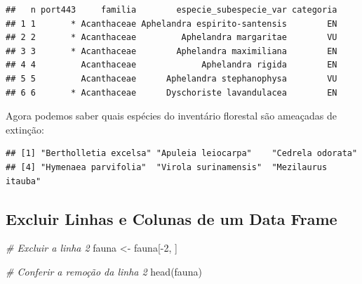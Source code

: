 \documentclass[
]{article}
\newenvironment{Shaded}{\begin{snugshade}}{\end{snugshade}}
\newcommand{\CommentTok}[1]{\textcolor[rgb]{0.56,0.35,0.01}{\textit{#1}}}
\newcommand{\DecValTok}[1]{\textcolor[rgb]{0.00,0.00,0.81}{#1}}
\newcommand{\FunctionTok}[1]{\textcolor[rgb]{0.00,0.00,0.00}{#1}}
\newcommand{\NormalTok}[1]{#1}
\newcommand{\OtherTok}[1]{\textcolor[rgb]{0.56,0.35,0.01}{#1}}
\newcommand{\SpecialCharTok}[1]{\textcolor[rgb]{0.00,0.00,0.00}{#1}}
\begin{document}
\begin{verbatim}
##   n port443     familia        especie_subespecie_var categoria
## 1 1       * Acanthaceae Aphelandra espirito-santensis        EN
## 2 2       * Acanthaceae         Aphelandra margaritae        VU
## 3 3       * Acanthaceae        Aphelandra maximiliana        EN
## 4 4         Acanthaceae             Aphelandra rigida        EN
## 5 5         Acanthaceae      Aphelandra stephanophysa        VU
## 6 6       * Acanthaceae      Dyschoriste lavandulacea        EN
\end{verbatim}

\begin{Shaded}
\end{Shaded}

Agora podemos saber quais espécies do inventário florestal são ameaçadas
de extinção:

\begin{Shaded}
\end{Shaded}

\begin{verbatim}
## [1] "Bertholletia excelsa" "Apuleia leiocarpa"    "Cedrela odorata"     
## [4] "Hymenaea parvifolia"  "Virola surinamensis"  "Mezilaurus itauba"
\end{verbatim}

\hypertarget{excluir-linhas-e-colunas-de-um-data-frame}{%
\subsection{Excluir Linhas e Colunas de um Data
Frame}\label{excluir-linhas-e-colunas-de-um-data-frame}}

\begin{Shaded}
\begin{Highlighting}[]
\CommentTok{\# Excluir a linha 2}
\NormalTok{fauna }\OtherTok{\textless{}{-}}\NormalTok{ fauna[}\SpecialCharTok{{-}}\DecValTok{2}\NormalTok{, ]}

\CommentTok{\# Conferir a remoção da linha 2}
\FunctionTok{head}\NormalTok{(fauna)}
\end{Highlighting}
\end{Shaded}
\end{document}

